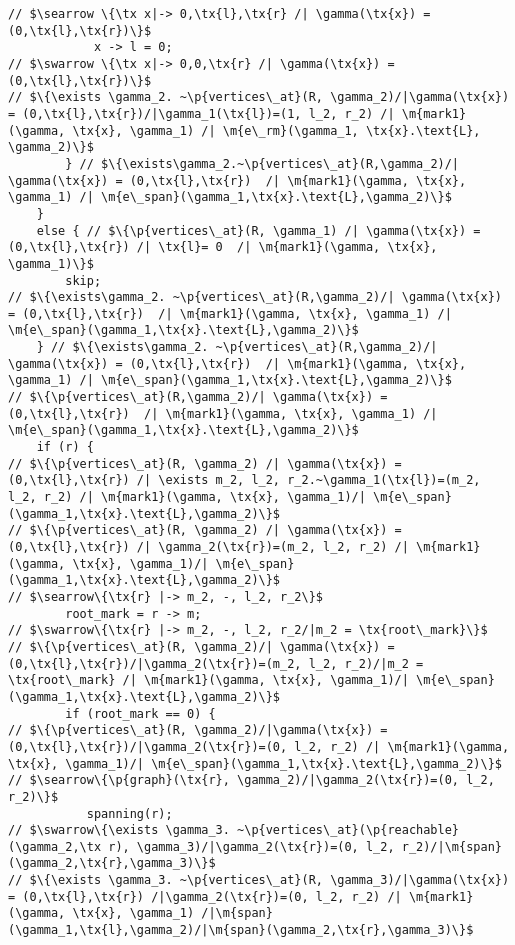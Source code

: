 \begin{figure*}
\begin{lstlisting}
// $\searrow \{\tx x|-> 0,\tx{l},\tx{r} /| \gamma(\tx{x}) = (0,\tx{l},\tx{r})\}$
            x -> l = 0;
// $\swarrow \{\tx x|-> 0,0,\tx{r} /| \gamma(\tx{x}) = (0,\tx{l},\tx{r})\}$
// $\{\exists \gamma_2. ~\p{vertices\_at}(R, \gamma_2)/|\gamma(\tx{x}) = (0,\tx{l},\tx{r})/|\gamma_1(\tx{l})=(1, l_2, r_2) /| \m{mark1}(\gamma, \tx{x}, \gamma_1) /| \m{e\_rm}(\gamma_1, \tx{x}.\text{L}, \gamma_2)\}$
        } // $\{\exists\gamma_2.~\p{vertices\_at}(R,\gamma_2)/| \gamma(\tx{x}) = (0,\tx{l},\tx{r})  /| \m{mark1}(\gamma, \tx{x}, \gamma_1) /| \m{e\_span}(\gamma_1,\tx{x}.\text{L},\gamma_2)\}$
    }
    else { // $\{\p{vertices\_at}(R, \gamma_1) /| \gamma(\tx{x}) = (0,\tx{l},\tx{r}) /| \tx{l}= 0  /| \m{mark1}(\gamma, \tx{x}, \gamma_1)\}$
        skip;
// $\{\exists\gamma_2. ~\p{vertices\_at}(R,\gamma_2)/| \gamma(\tx{x}) = (0,\tx{l},\tx{r})  /| \m{mark1}(\gamma, \tx{x}, \gamma_1) /| \m{e\_span}(\gamma_1,\tx{x}.\text{L},\gamma_2)\}$
    } // $\{\exists\gamma_2. ~\p{vertices\_at}(R,\gamma_2)/| \gamma(\tx{x}) = (0,\tx{l},\tx{r})  /| \m{mark1}(\gamma, \tx{x}, \gamma_1) /| \m{e\_span}(\gamma_1,\tx{x}.\text{L},\gamma_2)\}$
// $\{\p{vertices\_at}(R,\gamma_2)/| \gamma(\tx{x}) = (0,\tx{l},\tx{r})  /| \m{mark1}(\gamma, \tx{x}, \gamma_1) /|  \m{e\_span}(\gamma_1,\tx{x}.\text{L},\gamma_2)\}$
    if (r) {
// $\{\p{vertices\_at}(R, \gamma_2) /| \gamma(\tx{x}) = (0,\tx{l},\tx{r}) /| \exists m_2, l_2, r_2.~\gamma_1(\tx{l})=(m_2, l_2, r_2) /| \m{mark1}(\gamma, \tx{x}, \gamma_1)/| \m{e\_span}(\gamma_1,\tx{x}.\text{L},\gamma_2)\}$
// $\{\p{vertices\_at}(R, \gamma_2) /| \gamma(\tx{x}) = (0,\tx{l},\tx{r}) /| \gamma_2(\tx{r})=(m_2, l_2, r_2) /| \m{mark1}(\gamma, \tx{x}, \gamma_1)/| \m{e\_span}(\gamma_1,\tx{x}.\text{L},\gamma_2)\}$
// $\searrow\{\tx{r} |-> m_2, -, l_2, r_2\}$
        root_mark = r -> m;
// $\swarrow\{\tx{r} |-> m_2, -, l_2, r_2/|m_2 = \tx{root\_mark}\}$
// $\{\p{vertices\_at}(R, \gamma_2)/| \gamma(\tx{x}) = (0,\tx{l},\tx{r})/|\gamma_2(\tx{r})=(m_2, l_2, r_2)/|m_2 = \tx{root\_mark} /| \m{mark1}(\gamma, \tx{x}, \gamma_1)/| \m{e\_span}(\gamma_1,\tx{x}.\text{L},\gamma_2)\}$
        if (root_mark == 0) {
// $\{\p{vertices\_at}(R, \gamma_2)/|\gamma(\tx{x}) = (0,\tx{l},\tx{r})/|\gamma_2(\tx{r})=(0, l_2, r_2) /| \m{mark1}(\gamma, \tx{x}, \gamma_1)/| \m{e\_span}(\gamma_1,\tx{x}.\text{L},\gamma_2)\}$
// $\searrow\{\p{graph}(\tx{r}, \gamma_2)/|\gamma_2(\tx{r})=(0, l_2, r_2)\}$
           spanning(r);
// $\swarrow\{\exists \gamma_3. ~\p{vertices\_at}(\p{reachable}(\gamma_2,\tx r), \gamma_3)/|\gamma_2(\tx{r})=(0, l_2, r_2)/|\m{span}(\gamma_2,\tx{r},\gamma_3)\}$
// $\{\exists \gamma_3. ~\p{vertices\_at}(R, \gamma_3)/|\gamma(\tx{x}) = (0,\tx{l},\tx{r}) /|\gamma_2(\tx{r})=(0, l_2, r_2) /| \m{mark1}(\gamma, \tx{x}, \gamma_1) /|\m{span}(\gamma_1,\tx{l},\gamma_2)/|\m{span}(\gamma_2,\tx{r},\gamma_3)\}$

\end{lstlisting}
\end{figure*}

